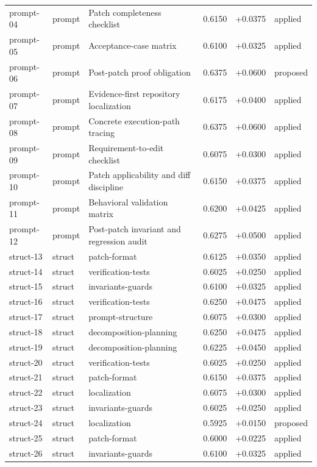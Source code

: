 \begin{center}
\begin{longtable}{llp{5.2cm}rrl}
prompt-04 & prompt & Patch completeness checklist & 0.6150 & +0.0375 & applied \\
prompt-05 & prompt & Acceptance-case matrix & 0.6100 & +0.0325 & applied \\
prompt-06 & prompt & Post-patch proof obligation & 0.6375 & +0.0600 & proposed \\
prompt-07 & prompt & Evidence-first repository localization & 0.6175 & +0.0400 & applied \\
prompt-08 & prompt & Concrete execution-path tracing & 0.6375 & +0.0600 & applied \\
prompt-09 & prompt & Requirement-to-edit checklist & 0.6075 & +0.0300 & applied \\
prompt-10 & prompt & Patch applicability and diff discipline & 0.6150 & +0.0375 & applied \\
prompt-11 & prompt & Behavioral validation matrix & 0.6200 & +0.0425 & applied \\
prompt-12 & prompt & Post-patch invariant and regression audit & 0.6275 & +0.0500 & applied \\
struct-13 & struct & patch-format & 0.6125 & +0.0350 & applied \\
struct-14 & struct & verification-tests & 0.6025 & +0.0250 & applied \\
struct-15 & struct & invariants-guards & 0.6100 & +0.0325 & applied \\
struct-16 & struct & verification-tests & 0.6250 & +0.0475 & applied \\
struct-17 & struct & prompt-structure & 0.6075 & +0.0300 & applied \\
struct-18 & struct & decomposition-planning & 0.6250 & +0.0475 & applied \\
struct-19 & struct & decomposition-planning & 0.6225 & +0.0450 & applied \\
struct-20 & struct & verification-tests & 0.6025 & +0.0250 & applied \\
struct-21 & struct & patch-format & 0.6150 & +0.0375 & applied \\
struct-22 & struct & localization & 0.6075 & +0.0300 & applied \\
struct-23 & struct & invariants-guards & 0.6025 & +0.0250 & applied \\
struct-24 & struct & localization & 0.5925 & +0.0150 & proposed \\
struct-25 & struct & patch-format & 0.6000 & +0.0225 & applied \\
struct-26 & struct & invariants-guards & 0.6100 & +0.0325 & applied \\

\end{longtable}
\end{center}
